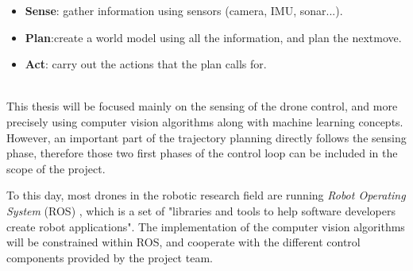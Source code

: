 \begin{itemize}
	\item{\textbf{Sense}}: gather information using sensors (camera, IMU, sonar...).
	\item{\textbf{Plan}}:create a world model using all the information, and plan
		the nextmove.
	\item{\textbf{Act}}: carry out the actions that the plan calls for.
\end{itemize}
~\\
This thesis will be focused mainly on the sensing of the drone control, and
more precisely using computer vision algorithms along with machine learning
concepts. However, an important part of the trajectory planning directly
follows the sensing phase, therefore those two first phases of the control loop
can be included in the scope of the project.

To this day, most drones in the robotic research field are running \emph{Robot
Operating System} (ROS) , which is a set of "libraries and
tools to help software developers create robot applications". The implementation
of the computer vision algorithms will be constrained within ROS, and cooperate
with the different control components provided by the project team.\\



